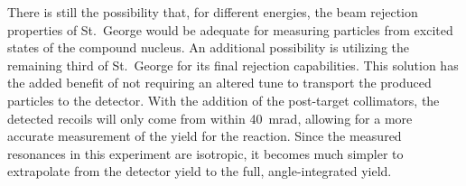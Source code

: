 There is still the possibility that, for different energies, the beam
rejection properties of St.\ George would be adequate for measuring
particles from excited states of the compound nucleus. An additional
possibility is utilizing the remaining third of St.\ George for its
final rejection capabilities. This solution has the added benefit of not
requiring an altered tune to transport the produced particles to the
detector. With the addition of the post-target collimators, the detected
recoils will only come from within 40~mrad, allowing for a more accurate
measurement of the yield for the reaction. Since the measured resonances
in this experiment are isotropic, it becomes much simpler to extrapolate
from the detector yield to the full, angle-integrated yield.
